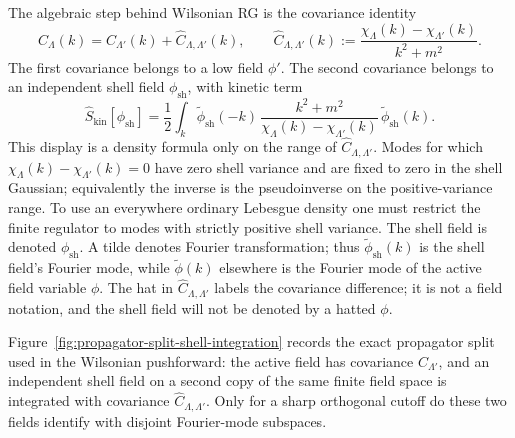The algebraic step behind Wilsonian RG is the covariance identity
\begin{equation}
  C_\Lambda(k)
  =
  C_{\Lambda'}(k)+\widehat C_{\Lambda,\Lambda'}(k),
  \qquad
  \widehat C_{\Lambda,\Lambda'}(k)
  :=
  \frac{\chi_\Lambda(k)-\chi_{\Lambda'}(k)}{k^2+m^2}.
  \label{eq:wilsonian-covariance-split}
\end{equation}
The first covariance belongs to a low field \(\phi'\).  The second covariance
belongs to an independent shell field \(\phi_{\mathrm{sh}}\), with kinetic term
\begin{equation}
  \widehat S_{\mathrm{kin}}[\phi_{\mathrm{sh}}]
  =
  \frac12\int_k
  \widetilde\phi_{\mathrm{sh}}(-k)\,
  \frac{k^2+m^2}{\chi_\Lambda(k)-\chi_{\Lambda'}(k)}\,
  \widetilde\phi_{\mathrm{sh}}(k).
  \label{eq:shell-kinetic-term}
\end{equation}
This display is a density formula only on the range of
\(\widehat C_{\Lambda,\Lambda'}\).  Modes for which
\(\chi_\Lambda(k)-\chi_{\Lambda'}(k)=0\) have zero shell variance and are fixed
to zero in the shell Gaussian; equivalently the inverse is the pseudoinverse on
the positive-variance range.  To use an everywhere ordinary Lebesgue density
one must restrict the finite regulator to modes with strictly positive shell
variance.
The shell field is denoted \(\phi_{\mathrm{sh}}\).  A tilde denotes
Fourier transformation; thus \(\widetilde\phi_{\mathrm{sh}}(k)\) is the shell
field's Fourier mode, while \(\widetilde\phi(k)\) elsewhere is the Fourier mode
of the active field variable \(\phi\).  The hat in
\(\widehat C_{\Lambda,\Lambda'}\) labels the covariance difference; it is not a
field notation, and the shell field will not be denoted by
a hatted \(\phi\).

Figure~\ref{fig:propagator-split-shell-integration} records the exact propagator
split used in the Wilsonian pushforward: the active field has covariance
\(C_{\Lambda'}\), and an independent shell field on a second copy of the same
finite field space is integrated with covariance
\(\widehat C_{\Lambda,\Lambda'}\).  Only for a sharp orthogonal cutoff do these
two fields identify with disjoint Fourier-mode subspaces.

